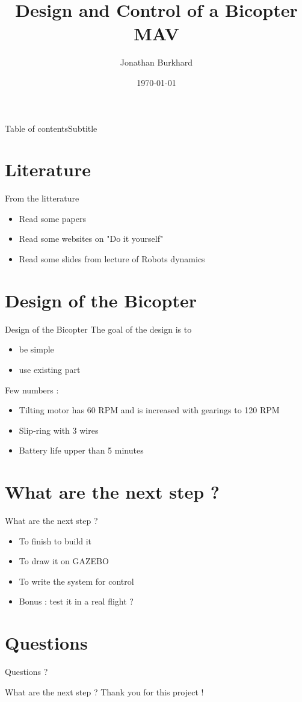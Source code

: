 \documentclass{beamer}
\author{Jonathan Burkhard}
\title{Design and Control of a Bicopter MAV}
\date{\today}
\begin{document}
\frame{\maketitle}
\begin{frame}{Table of contents}{Subtitle}
	\tableofcontents
\end{frame}

\section{Literature}
\begin{frame}{From the litterature}
\begin{itemize}
\item Read some papers 
\item Read some websites on "Do it yourself"
\item Read some slides from lecture of Robots dynamics
\end{itemize}
\end{frame}


\section{Design of the Bicopter}
\begin{frame}{Design of the Bicopter}
The goal of the design is to
\begin{itemize}
\item be simple
\item use existing part
\end{itemize}
Few numbers :
\begin{itemize}
\item Tilting motor has 60 RPM and is increased with gearings to 120 RPM
\item Slip-ring with 3 wires
\item Battery life upper than 5 minutes
\end{itemize}
\end{frame}


\section{What are the next step ?}
\begin{frame}{What are the next step ?}
\begin{itemize}
\item To finish to build it
\item To draw it on GAZEBO
\item To write the system for control
\item Bonus : test it in a real flight ?
\end{itemize}
\end{frame}

\section{Questions}
\begin{frame}{}
\huge{Questions ?}
\end{frame}

\begin{frame}{What are the next step ?}
\huge{Thank you for this project !}
\end{frame}
\end{document}
